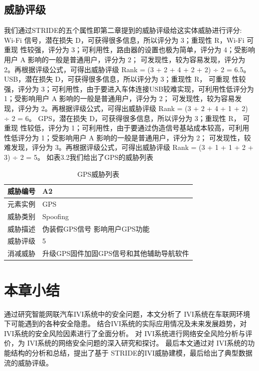 \subsection{威胁评级}
我们通过STRIDE的五个属性即第二章提到的威胁评级给这实体威胁进行评分:
Wi-Fi 信号，潜在损失 D，可获得很多信息，所以评分为 3；重现性 R，Wi-Fi 可重现
性较强，评分为 3；可利用性，路由器的设置也极为简单，评分为 4；受影响用户 A 影响的一般是普通用户，评分为 2；
可发现性，较为容易发现，评分为 2。再根据评级公式，可得出威胁评级 Rank = (3 + 2 + 4 + 2 + 2) ÷ 2 = 6.5。
USB，潜在损失 D，可获得很多信息，所以评分为 3；重现性 R， 可重现
性较强，评分为 3；可利用性，由于要进入车体连接USB较难实现，可利用性低评分为 1；受影响用户 A 影响的一般是普通用户，评分为 2；
可发现性，较为容易发现，评分为 2。再根据评级公式，可得出威胁评级 Rank = (3 + 2 + 4 + 1 + 2) ÷ 2 = 6。
GPS，潜在损失 D，可获得很多信息，所以评分为 3；重现性 R， 可重现
性较低，评分为 1；可利用性，由于要通过伪造信号基站成本较高，可利用性低评分为 1；受影响用户 A 影响的一般是普通用户，评分为 2；
可发现性，较难发现，评分为 3。再根据评级公式，可得出威胁评级 Rank = (3 + 1 + 1 + 2 + 3) ÷ 2 = 5。
如表3.2我们给出了GPS的威胁列表
\begin{table}
  \caption{GPS威胁列表}
\begin{center}
    \begin{tabular}{|l|l}
      \hline 威胁编号 & A2 \\
      \hline 元素实例 & GPS \\
      \hline 威胁类别 & Spoofing \\
      \hline 威胁描述 & 伪装假GPS信号 影响用户GPS功能 \\
      \hline 威胁评级 & 5 \\
      \hline 消减威胁 & 升级GPS固件加固GPS信号和其他辅助导航软件 \\
      \hline
      \end{tabular}
  \end{center}
\end{table}

\section{本章小结}
通过研究智能网联汽车IVI系统中的安全问题，本文分析了 IVI系统在车联网环境下可能遇到的各种安全隐患。
结合IVI系统的实际应用情况及未来发展趋势，对 IVI系统的安全风险因素进行了全面分析。
对 IVI系统进行网络安全风险分析与评价，为 IVI系统的网络安全问题的深入研究和探讨。
最后本文通过对 IVI系统的功能结构的分析和总结，提出了基于 STRIDE的IVI威胁建模，最后给出了典型数据流的威胁评级。
